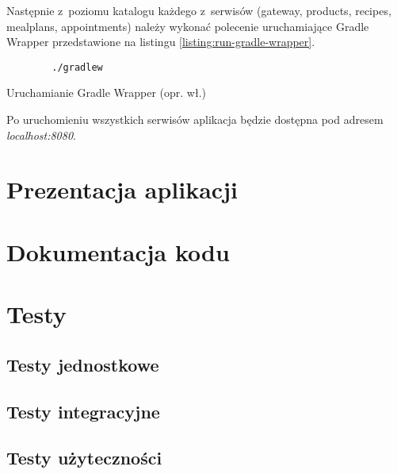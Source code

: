 Następnie z~poziomu katalogu każdego z~serwisów (gateway, products, recipes, mealplans, appointments)
należy wykonać polecenie uruchamiające Gradle Wrapper przedstawione na listingu \ref{listing:run-gradle-wrapper}.
\begin{listing}[h!]
    \begin{verbatim}
        ./gradlew
    \end{verbatim}
    \centering\caption{Uruchamianie Gradle Wrapper (opr. wł.)}\label{listing:run-gradle-wrapper}
\end{listing}

Po uruchomieniu wszystkich serwisów aplikacja będzie dostępna pod adresem \textit{localhost:8080}.

\section{Prezentacja aplikacji}\label{sec:app-presentation}

\section{Dokumentacja kodu}\label{sec:code-documentation}
\noindent
{}
\section{Testy}\label{sec:tests}
\subsection{Testy jednostkowe}\label{subsec:tests:unit}
\subsection{Testy integracyjne}\label{subsec:tests:integration}
\subsection{Testy użyteczności}\label{subsec:tests:usability}
\thispagestyle{normal}
